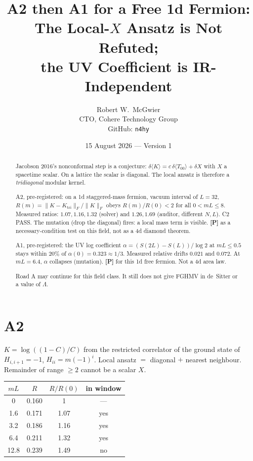 \documentclass[11pt]{article}
\title{\textbf{A2 then A1 for a Free 1d Fermion:\\
The Local-$X$ Ansatz is Not Refuted;\\
the UV Coefficient is IR-Independent}}
\author{Robert W.\ McGwier\\
\small CTO, Cohere Technology Group\\
\small GitHub: \texttt{n4hy}}
\date{15 August 2026 --- Version 1}
\newcommand{\pP}{\textbf{[P]}}
\begin{document}
\maketitle

\begin{abstract}
\noindent
Jacobson 2016's nonconformal step is a conjecture:
$\delta\langle K\rangle=c\,\delta\langle T_{00}\rangle+\delta X$ with
$X$ a spacetime scalar. On a lattice the scalar is diagonal. The
local ansatz is therefore a \emph{tridiagonal} modular kernel.

A2, pre-registered: on a 1d staggered-mass fermion, vacuum interval
of $L=32$,
$R(m)=\lVert K-K_{\mathrm{tri}}\rVert_F/\lVert K\rVert_F$ obeys
$R(m)/R(0)<2$ for all $0<mL\le 8$. Measured ratios:
$1.07,1.16,1.32$ (solver) and $1.26,1.69$ (auditor, different
$N,L$). C2 PASS. The mutation (drop the diagonal) fires: a local
mass term is visible. \pP{} as a necessary-condition test on this
field, not as a 4d diamond theorem.

A1, pre-registered: the UV log coefficient
$\alpha=(S(2L)-S(L))/\log 2$ at $mL\le 0.5$ stays within $20\%$ of
$\alpha(0)=0.323\approx 1/3$. Measured relative drifts $0.021$ and
$0.072$. At $mL=6.4$, $\alpha$ collapses (mutation). \pP{} for this
1d free fermion. Not a 4d area law.

Road A may continue for this field class. It still does not give
FGHMV in de~Sitter or a value of $\Lambda$.
\end{abstract}

\section{A2}

$K=\log((1-C)/C)$ from the restricted correlator of the ground state
of $H_{i,i+1}=-1$, $H_{ii}=m(-1)^i$. Local ansatz $=$ diagonal $+$
nearest neighbour. Remainder of range $\ge 2$ cannot be a scalar
$X$.

\begin{center}
\begin{tabular}{cccc}
\hline
$mL$ & $R$ & $R/R(0)$ & in window \\
\hline
0 & 0.160 & 1 & --- \\
1.6 & 0.171 & 1.07 & yes \\
3.2 & 0.186 & 1.16 & yes \\
6.4 & 0.211 & 1.32 & yes \\
12.8 & 0.239 & 1.49 & no \\
\hline
\end{tabular}
\end{center}
\end{document}

